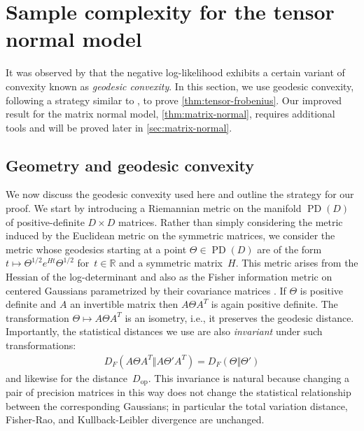 \documentclass[aos]{imsart}
\theoremstyle{definition}
\numberwithin{equation}{section}
\DeclareMathOperator{\op}{op}
\DeclareMathOperator{\PD}{PD}
\DeclarePairedDelimiter{\norm}{\lVert}{\rVert}
\newcommand{\R}{{\mathbb{R}}}
\begin{document}
\section{Sample complexity for the tensor normal model}\label{sec:tensor-normal}
It was observed by \cite{wiesel2012geodesic} that the negative log-likelihood exhibits a certain variant of convexity known as \emph{geodesic convexity}.
In this section, we use geodesic convexity, following a strategy similar to \cite{FM20}, to prove \cref{thm:tensor-frobenius}.
Our improved result for the matrix normal model, \cref{thm:matrix-normal}, requires additional tools and will
be proved later in \cref{sec:matrix-normal}.

\subsection{Geometry and geodesic convexity}\label{subsec:geom}
We now discuss the geodesic convexity used here and outline the strategy for our proof.
We start by introducing a Riemannian metric on the manifold $\PD(D)$ of positive-definite $D\times D$ matrices.
Rather than simply considering the metric induced by the Euclidean metric on the symmetric matrices, we consider the metric whose geodesics starting at a point $\Theta \in \PD(D)$ are of the form $t \mapsto \Theta^{1/2} e^{Ht} \Theta^{1/2}$ for~$t \in \R$ and a symmetric matrix~$H$. %
This metric arises from the Hessian of the log-determinant \citep{bhatia2009positive} and also as the Fisher information metric on centered Gaussians parametrized by their covariance matrices \citep{skovgaard1984riemannian}.
If $\Theta$ is positive definite and $A$ an invertible matrix then $A\Theta A^T$ is again  positive definite.
The transformation $\Theta \mapsto A\Theta A^T$ is an isometry, i.e., it preserves the geodesic distance.
Importantly, the statistical distances we use are also \emph{invariant} under such transformations:
\begin{align*}
  D_F(A \Theta A^T \Vert A \Theta' A^T) = D_F(\Theta \Vert \Theta')
\end{align*}
and likewise for the distance~$D_{\op}$.
This invariance is natural because changing a pair of precision matrices in this way does not change the statistical relationship between the corresponding Gaussians; in particular the total variation distance, Fisher-Rao, and Kullback-Leibler divergence are unchanged.
\end{document}
